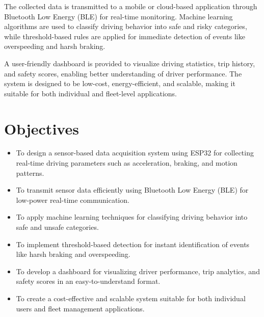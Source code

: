 The collected data is transmitted to a mobile or cloud-based application through Bluetooth Low Energy (BLE) for real-time monitoring. Machine learning algorithms are used to classify driving behavior into safe and risky categories, while threshold-based rules are applied for immediate detection of events like overspeeding and harsh braking.

A user-friendly dashboard is provided to visualize driving statistics, trip history, and safety scores, enabling better understanding of driver performance. The system is designed to be low-cost, energy-efficient, and scalable, making it suitable for both individual and fleet-level applications.

\section{Objectives}
\label{sec:objectives}
\begin{itemize}
    \item To design a sensor-based data acquisition system using ESP32 for collecting real-time driving parameters such as acceleration, braking, and motion patterns.
    \item To transmit sensor data efficiently using Bluetooth Low Energy (BLE) for low-power real-time communication.
    \item To apply machine learning techniques for classifying driving behavior into safe and unsafe categories.
    \item To implement threshold-based detection for instant identification of events like harsh braking and overspeeding.
    \item To develop a dashboard for visualizing driver performance, trip analytics, and safety scores in an easy-to-understand format.
    \item To create a cost-effective and scalable system suitable for both individual users and fleet management applications.
\end{itemize}

